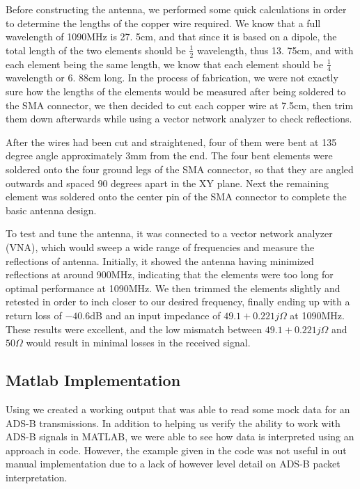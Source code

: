 \documentclass[conference]{IEEEtran}
\begin{document}
Before constructing the antenna, we performed some quick calculations in order to determine the lengths of the copper wire required.
We know that a full wavelength of 1090MHz is 27.
5cm, and that since it is based on a dipole, the total length of the two elements should be $\frac{1}{2}$ wavelength, thus 13.
75cm, and with each element being the same length, we know that each element should be $\frac{1}{4}$ wavelength or 6.
88cm long. In the process of fabrication, we were not exactly sure how the lengths of the elements would be measured after being soldered to the SMA connector, we then decided to cut each copper wire at 7.5cm, then trim them down afterwards while using a vector network analyzer to check reflections.

After the wires had been cut and straightened, four of them were bent at 135 degree angle approximately 3mm from the end.
The four bent elements were soldered onto the four ground legs of the SMA connector, so that they are angled outwards and spaced 90 degrees apart in the XY plane.
Next the remaining element was soldered onto the center pin of the SMA connector to complete the basic antenna design. 

To test and tune the antenna, it was connected to a vector network analyzer (VNA), which would sweep a wide range of frequencies and measure the reflections of antenna.
Initially, it showed the antenna having minimized reflections at around 900MHz, indicating that the elements were too long for optimal performance at 1090MHz.
We then trimmed the elements slightly and retested in order to inch closer to our desired frequency, finally ending up with a return loss of $-40.6$dB and an input impedance of $49.1+0.221j\Omega$ at 1090MHz.
These results were excellent, and the low mismatch between $49.1+0.221j\Omega$ and $50\Omega$ would result in minimal losses in the received signal.


\subsection{Matlab Implementation}
 Using \cite{matlabAir} we created a working output that was able to read some mock data for an ADS-B transmissions.
In addition to helping us verify the ability to work with ADS-B signals in MATLAB, we were able to see how data is interpreted using an approach in code. 
However, the example given in the code was not useful in out manual implementation due to a lack of however level detail on ADS-B packet interpretation.
\end{document}

